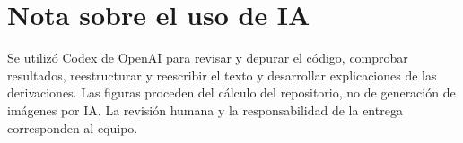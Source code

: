 \section*{Nota sobre el uso de IA}
Se utilizó Codex de OpenAI para revisar y depurar el código, comprobar resultados, reestructurar y reescribir el texto y desarrollar explicaciones de las derivaciones. Las figuras proceden del cálculo del repositorio, no de generación de imágenes por IA. La revisión humana y la responsabilidad de la entrega corresponden al equipo.

